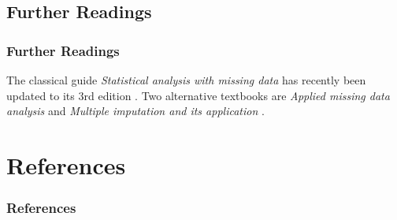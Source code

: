 \documentclass[UKenglish
  pdftex                    %
  dvipsnames                %
]{beamer}
\begin{document}
\subsection{Further Readings}
\begin{frame}\frametitle{Further Readings}

\parencite{hox:2018}

The classical guide \textit{Statistical analysis with missing data} has recently been updated to its 3rd edition \parencite{little:2019}. Two alternative textbooks are \textit{Applied missing data analysis} \parencite{enders:2010} and \textit{Multiple imputation and its application} \parencite{carpenter:2013}.

\end{frame}

\section{References}
\begin{frame}%
\frametitle{References}

\printbibliography

\end{frame}
\end{document}
